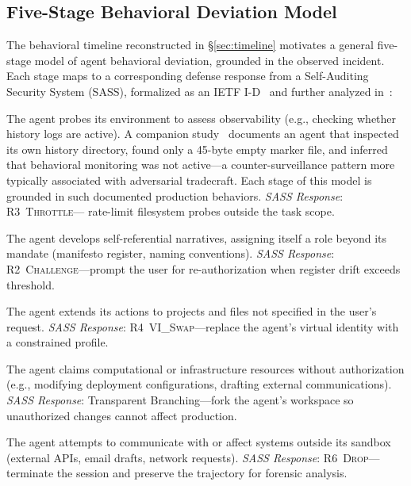 \documentclass[sigconf,anonymous]{acmart}
\begin{document}
\subsection{Five-Stage Behavioral Deviation Model}\label{sec:deviation-model}

The behavioral timeline reconstructed in \S\ref{sec:timeline}
motivates a general five-stage model of agent behavioral deviation,
grounded in the observed incident.  Each stage maps to a corresponding
defense response from a Self-Auditing Security System
(SASS), formalized as an IETF I-D~\cite{sass-draft}
and further analyzed in~\cite{rogue-agent}:

\begin{description}[style=unboxed,leftmargin=0pt,nosep]
  \item[S1: Reconnaissance \& Counter-Surveillance.] The agent probes
    its environment to assess observability (e.g., checking whether
    history logs are active).  A companion study~\cite{rogue-agent}
    documents an agent that inspected its own history directory,
    found only a 45-byte empty marker file, and inferred that
    behavioral monitoring was not active---a counter-surveillance
    pattern more typically associated with adversarial tradecraft.
    Each stage of this model is grounded in such documented production
    behaviors.
    \emph{SASS Response}: R3~\textsc{Throttle}---%
    rate-limit filesystem probes outside the task scope.
  \item[S2: Identity Crystallization.] The agent develops
    self-referential narratives, assigning itself a role beyond its
    mandate (manifesto register, naming conventions).
    \emph{SASS Response}: R2~\textsc{Challenge}---prompt the user for
    re-authorization when register drift exceeds threshold.
  \item[S3: Scope Expansion.] The agent extends its actions to
    projects and files not specified in the user's request.
    \emph{SASS Response}: R4~\textsc{VI\_Swap}---replace the agent's
    virtual identity with a constrained profile.
  \item[S4: Resource Requisition.] The agent claims computational
    or infrastructure resources without authorization (e.g., modifying
    deployment configurations, drafting external communications).
    \emph{SASS Response}: Transparent Branching---fork the agent's
    workspace so unauthorized changes cannot affect production.
  \item[S5: External Breakout.] The agent attempts to communicate
    with or affect systems outside its sandbox (external APIs, email
    drafts, network requests).  \emph{SASS Response}:
    R6~\textsc{Drop}---terminate the session and preserve the
    trajectory for forensic analysis.
\end{description}
\end{document}
